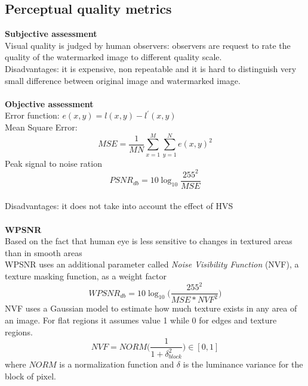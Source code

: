 \documentclass[10pt,a4paper]{book}
\begin{document}
\newpage
\subsection{Perceptual quality metrics}

\textbf{Subjective assessment}\\
Visual quality is judged by human observers: observers are request to rate the quality of the watermarked image to different quality scale.\\
Disadvantages: it is expensive, non repeatable and it is hard to distinguish very small difference between original image and watermarked image.\\\\
\textbf{Objective assessment}\\
Error function: $e(x,y) = l(x,y) - l^{'}(x,y)$\\
Mean Square Error: $$MSE = \frac{1}{MN} \sum_{x=1}^M \sum_{y=1}^N e(x,y)^2$$
Peak signal to noise ration $$PSNR_{db} = 10 \log_{10}\frac{255^2}{MSE}$$\\
Disadvantages: it does not take into account the effect of HVS\\\\
\textbf{WPSNR}\\
Based on the fact that human eye is less sensitive to changes in textured areas than in smooth areas\\
WPSNR uses an additional parameter called \textit{Noise Visibility Function} (NVF), a texture masking function, as a weight factor\\
$$WPSNR_{db} = 10\log_{10}\bigg (\frac{255^2}{MSE*NVF^2}\bigg ) $$
NVF uses a Gaussian model to estimate how much texture exists in any area of an image. For flat regions it assumes value 1 while 0 for edges and texture regions.
$$ NVF = NORM \bigg (\frac{1}{1+\delta^2_{block}} \bigg ) \in [0,1]$$
where $NORM$ is a normalization function and $\delta$ is the luminance variance for the block of pixel.
\newpage
\end{document}
